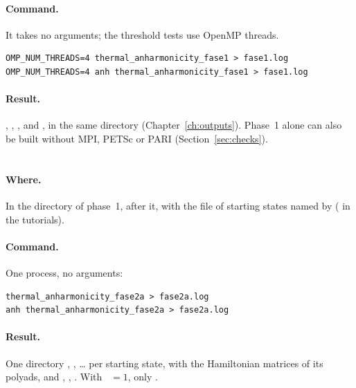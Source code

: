 \paragraph{Command.} It takes no arguments; the threshold tests use
OpenMP threads.
\begin{lstlisting}
OMP_NUM_THREADS=4 thermal_anharmonicity_fase1 > fase1.log
OMP_NUM_THREADS=4 anh thermal_anharmonicity_fase1 > fase1.log
\end{lstlisting}

\paragraph{Result.} , ,
,  and , in the
same directory (Chapter~\ref{ch:outputs}). Phase~1 alone can also be built
without MPI, PETSc or PARI (Section~\ref{sec:checks}).

\section{}\label{sec:run-fase2a}

\paragraph{Where.} In the directory of phase~1, after it, with the file of
starting states named by  ( in the
tutorials).

\paragraph{Command.} One process, no arguments:
\begin{lstlisting}
thermal_anharmonicity_fase2a > fase2a.log
anh thermal_anharmonicity_fase2a > fase2a.log
\end{lstlisting}

\paragraph{Result.} One directory , ,
\ldots{} per starting state, with the Hamiltonian matrices of its polyads,
and , , .
With ~$=1$, only .

\section{}\label{sec:run-fase2b}

